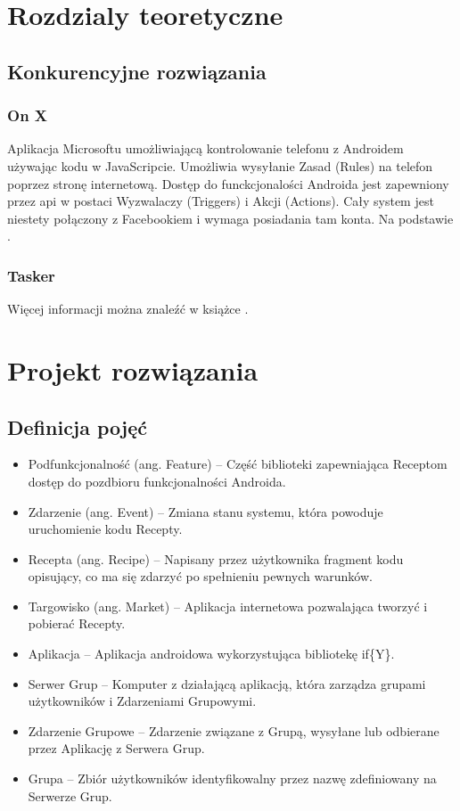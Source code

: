 \documentclass[11pt,a4paper,polish,thesis]{dcsbook}
\begin{document}
\chapter{Rozdzialy teoretyczne}
\section{Konkurencyjne rozwiązania}
\subsection{On X}
Aplikacja Microsoftu umożliwiającą kontrolowanie telefonu z Androidem używając kodu w JavaScripcie. Umożliwia wysyłanie Zasad (Rules) na telefon poprzez stronę internetową. Dostęp do funckcjonalości Androida jest zapewniony przez api w postaci Wyzwalaczy (Triggers) i Akcji (Actions). Cały system jest niestety połączony z Facebookiem i wymaga posiadania tam konta.
Na podstawie \cite{onx}.
\subsection{Tasker}
Więcej informacji można znaleźć w książce \cite{sop}.
\chapter{Projekt rozwiązania}
\section{Definicja pojęć}
\begin{itemize}
\item Podfunkcjonalność (ang. Feature) -- Część biblioteki zapewniająca Receptom dostęp do pozdbioru funkcjonalności Androida.
\item Zdarzenie (ang. Event) -- Zmiana stanu systemu, która powoduje uruchomienie kodu Recepty.
\item Recepta (ang. Recipe) -- Napisany przez użytkownika fragment kodu opisujący, co ma się zdarzyć po spełnieniu pewnych warunków.
\item Targowisko (ang. Market) -- Aplikacja internetowa pozwalająca tworzyć i pobierać Recepty.
\item Aplikacja -- Aplikacja androidowa wykorzystująca bibliotekę if\{Y\}. 
\item Serwer Grup -- Komputer z działającą aplikacją, która zarządza grupami użytkowników i Zdarzeniami Grupowymi.
\item Zdarzenie Grupowe -- Zdarzenie związane z Grupą, wysyłane lub odbierane przez Aplikację z Serwera Grup.
\item Grupa -- Zbiór użytkowników identyfikowalny przez nazwę zdefiniowany na Serwerze Grup.
\end{itemize}
\end{document}
